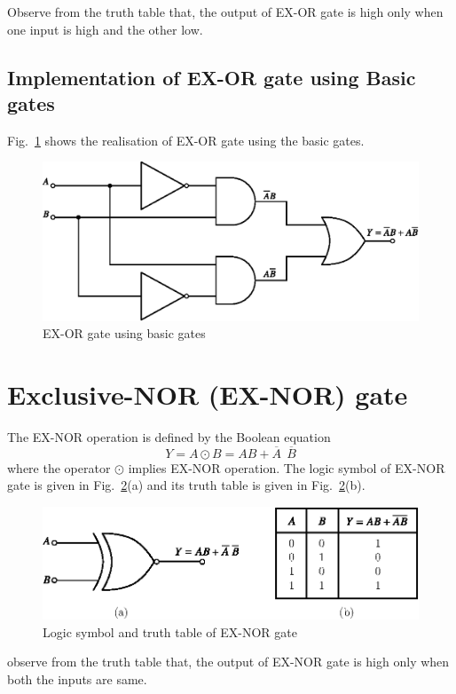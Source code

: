 Observe from the truth table that, the output of EX-OR gate is high only when one input is high and the other low.

\eject

\subsection{Implementation of EX-OR gate using Basic gates}\label{sec6.24.1}

Fig.~\ref{fig6.23} shows the realisation of EX-OR gate using the basic gates.
\begin{figure}[H]
\centering
\includegraphics{chap6/fig95_6.23.eps}
\caption{EX-OR gate using basic gates}\label{fig6.23}
\end{figure}

\section{Exclusive-NOR (EX-NOR) gate}\label{sec6.25}

The EX-NOR operation is defined by the Boolean equation
$$
Y=A\odot B=AB+\overline{A} \ \ \overline{B}
$$
where the operator $\odot$ implies EX-NOR operation. The logic symbol of EX-NOR gate is given in Fig.~\ref{fig6.24}(a) and its truth table is given in Fig.~\ref{fig6.24}(b).
\begin{figure}[H]
\centering
\includegraphics{chap6/fig96_6.24a.eps}
\caption{Logic symbol and truth table of EX-NOR gate}\label{fig6.24}
\end{figure}
\noindent
observe from the truth table that, the output of EX-NOR gate is high only when both the inputs are same.

